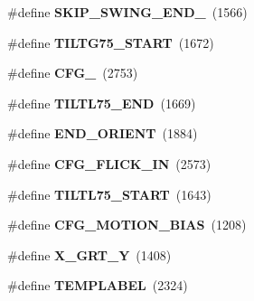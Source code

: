 \begin{DoxyCompactItemize}
\item 
\#define {\bfseries S\+K\+I\+P\+\_\+\+S\+W\+I\+N\+G\+\_\+\+E\+N\+D\+\_}~(1566)\hypertarget{group___d_r_i_v_e_r_s_gad179280ab7654fcada6f0816f6b0eda8}{}\label{group___d_r_i_v_e_r_s_gad179280ab7654fcada6f0816f6b0eda8}

\item 
\#define {\bfseries T\+I\+L\+T\+G75\+\_\+\+S\+T\+A\+RT}~(1672)\hypertarget{group___d_r_i_v_e_r_s_ga158f88485952a3849f3833c145854d99}{}\label{group___d_r_i_v_e_r_s_ga158f88485952a3849f3833c145854d99}

\item 
\#define {\bfseries C\+F\+G\+\_}~(2753)\hypertarget{group___d_r_i_v_e_r_s_ga40938f669c5b33b4316a7a5fba679eba}{}\label{group___d_r_i_v_e_r_s_ga40938f669c5b33b4316a7a5fba679eba}

\item 
\#define {\bfseries T\+I\+L\+T\+L75\+\_\+\+E\+ND}~(1669)\hypertarget{group___d_r_i_v_e_r_s_gac23b1dfe6637cd51283c18aa3d2e9c50}{}\label{group___d_r_i_v_e_r_s_gac23b1dfe6637cd51283c18aa3d2e9c50}

\item 
\#define {\bfseries E\+N\+D\+\_\+\+O\+R\+I\+E\+NT}~(1884)\hypertarget{group___d_r_i_v_e_r_s_gabe465e03425237cc6043670f55f28d02}{}\label{group___d_r_i_v_e_r_s_gabe465e03425237cc6043670f55f28d02}

\item 
\#define {\bfseries C\+F\+G\+\_\+\+F\+L\+I\+C\+K\+\_\+\+IN}~(2573)\hypertarget{group___d_r_i_v_e_r_s_gad4e759975ee4ab865e8bd1ebd7f48908}{}\label{group___d_r_i_v_e_r_s_gad4e759975ee4ab865e8bd1ebd7f48908}

\item 
\#define {\bfseries T\+I\+L\+T\+L75\+\_\+\+S\+T\+A\+RT}~(1643)\hypertarget{group___d_r_i_v_e_r_s_ga0ca3aa6c4c503f68cab0bbba28325f12}{}\label{group___d_r_i_v_e_r_s_ga0ca3aa6c4c503f68cab0bbba28325f12}

\item 
\#define {\bfseries C\+F\+G\+\_\+\+M\+O\+T\+I\+O\+N\+\_\+\+B\+I\+AS}~(1208)\hypertarget{group___d_r_i_v_e_r_s_ga8214527cbba23694722d04715126be0f}{}\label{group___d_r_i_v_e_r_s_ga8214527cbba23694722d04715126be0f}

\item 
\#define {\bfseries X\+\_\+\+G\+R\+T\+\_\+Y}~(1408)\hypertarget{group___d_r_i_v_e_r_s_ga70e52e79b5774e056a86795a52e3b027}{}\label{group___d_r_i_v_e_r_s_ga70e52e79b5774e056a86795a52e3b027}

\item 
\#define {\bfseries T\+E\+M\+P\+L\+A\+B\+EL}~(2324)\hypertarget{group___d_r_i_v_e_r_s_gaf08a08d5d5c6944564fe84a46227968d}{}\label{group___d_r_i_v_e_r_s_gaf08a08d5d5c6944564fe84a46227968d}


\end{DoxyCompactItemize}
